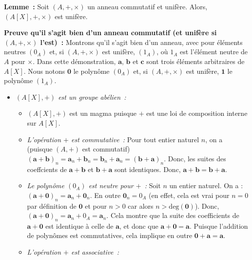\done

\medskip

\noindent\textbf{Lemme :} Soit $(A, +, \times)$ un anneau commutatif et unifère. 
    Alors, $(A[X], +, \times)$ est unifère.

\medskip

\noindent\textbf{Preuve qu'il s'agit bien d'un anneau commutatif (et unifère si $(A, +, \times)$ l'est) :} Montrons qu'il s'agit bien d'un anneau, avec pour éléments neutres $(0_A)$ et, si $(A, +, \times)$ est unifère, $(1_A)$, où $1_A$ est l'élément neutre de $A$ pour $\times$. 
Dans cette démonstration, $\mathbf{a}$, $\mathbf{b}$ et $\mathbf{c}$ sont trois éléments arbitraires de $A[X]$.
Nous notons $\mathbf{0}$ le polynôme $(0_A)$ et, si $(A, +, \times)$ est unifère, $\mathbf{1}$ le polynôme $(1_A)$.
\begin{itemize}[nosep]
    \item \textit{$(A[X], +)$ est un groupe abélien :}
        \begin{itemize}[nosep]
            \item $(A[X], +)$ est un magma puisque $+$ est une loi de composition interne sur $A[X]$.
            \item \textit{L'opération $+$ est commutative :} 
                Pour tout entier naturel $n$, on a (puisque $(A, +)$ est commutatif)
                $(\mathbf{a} + \mathbf{b})_n = \mathbf{a}_n + \mathbf{b}_n = \mathbf{b}_n + \mathbf{a}_n = (\mathbf{b} + \mathbf{a})_n$.
                Donc, les suites des coeffcients de $\mathbf{a} + \mathbf{b}$ et $\mathbf{b} + \mathbf{a}$ sont identiques.
                Donc, $\mathbf{a} + \mathbf{b} = \mathbf{b} + \mathbf{a}$.
            \item \textit{Le polynôme $(0_A)$ est neutre pour $+$ :} 
                Soit $n$ un entier naturel.
                On a : $(\mathbf{a} + \mathbf{0})_n = \mathbf{a}_n + \mathbf{0}_n$.
                En outre $\mathbf{0}_n = 0_A$ (en effet, cela est vrai pour $n = 0$ par définition de $\mathbf{0}$ et pour $n > 0$ car alors $n > \mathrm{deg}(\mathbf{0})$).
                Donc, $(\mathbf{a} + \mathbf{0})_n = \mathbf{a}_n + 0_A = \mathbf{a}_n$.
                Cela montre que la suite des coefficients de $\mathbf{a} + \mathbf{0}$ est identique à celle de $\mathbf{a}$, et donc que $\mathbf{a} + \mathbf{0} = \mathbf{a}$.
                Puisque l'addition de polynômes est commutatives, cela implique en outre $\mathbf{0} + \mathbf{a} = \mathbf{a}$.
            \item \textit{L'opération $+$ est associative :} 

\end{itemize}
\end{itemize}
